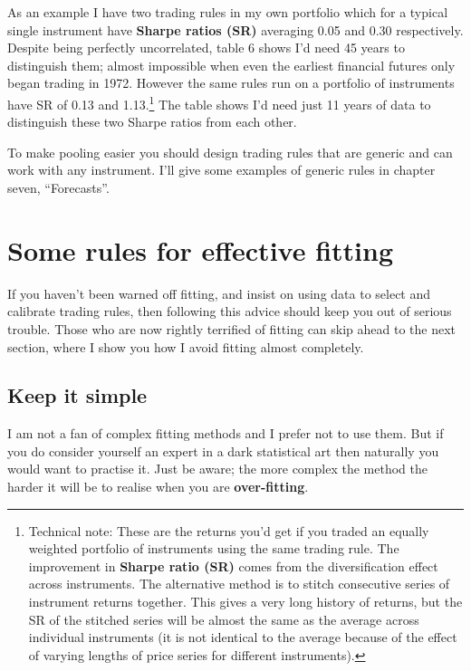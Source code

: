 As an example I have two trading rules in my own portfolio which for a typical single instrument have \textbf{Sharpe ratios (SR)} averaging 0.05 and 0.30 respectively. Despite being perfectly uncorrelated, table 6 shows I'd need 45 years to distinguish them; almost impossible when even the earliest financial futures only began trading in 1972. However the same rules run on a portfolio of instruments have SR of 0.13 and 1.13.\footnote{Technical note: These are the returns you'd get if you traded an equally weighted portfolio of instruments using the same trading rule. The improvement in \textbf{Sharpe ratio (SR)} comes from the diversification effect across instruments. The alternative method is to stitch consecutive series of instrument returns together. This gives a very long history of returns, but the SR of the stitched series will be almost the same as the average across individual instruments (it is not identical to the average because of the effect of varying lengths of price series for different instruments).} The table shows I'd need just 11 years of data to distinguish these two Sharpe ratios from each other.

To make pooling easier you should design trading rules that are generic and can work with any instrument. I'll give some examples of generic rules in chapter seven, ``Forecasts''.

\section*{Some rules for effective fitting}  {}

If you haven't been warned off fitting, and insist on using data to select and calibrate trading rules, then following this advice should keep you out of serious trouble. Those who are now rightly terrified of fitting can skip ahead to the next section, where I show you how I avoid fitting almost completely.

\subsection*{Keep it simple}

I am not a fan of complex fitting methods and I prefer not to use them. But if you do consider yourself an expert in a dark statistical art then naturally you would want to practise it. Just be aware; the more complex the method the harder it will be to realise when you are \textbf{over-fitting}.

